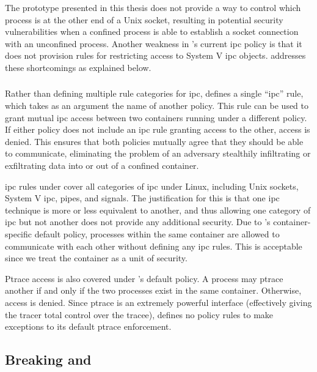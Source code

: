 The \bpfbox{} prototype presented in this thesis does not provide a way to control which
process is at the other end of a Unix socket, resulting in potential security
vulnerabilities when a confined process is able to establish a socket connection with an
unconfined process. Another weakness in \bpfbox{}'s current \gls{ipc} policy is that it
does not provision rules for restricting access to System V \gls{ipc} objects.
\bpfcontain{} addresses these shortcomings as explained below.

\subsubsection{\bpfcontain{}}

Rather than defining multiple rule categories for \gls{ipc}, \bpfcontain{} defines
a single \enquote{\gls{ipc}} rule, which takes as an argument the name of another
\bpfcontain{} policy. This rule can be used to grant mutual \gls{ipc} access between two
containers running under a different policy. If either policy does not include an
\gls{ipc} rule granting access to the other, access is denied. This ensures that both
policies mutually agree that they should be able to communicate, eliminating the problem
of an adversary stealthily infiltrating or exfiltrating data into or out of a confined
container.

\gls{ipc} rules under \bpfcontain{} cover all categories of \gls{ipc} under Linux,
including Unix sockets, System V \gls{ipc}, pipes, and signals. The justification for this
is that one \gls{ipc} technique is more or less equivalent to another, and thus allowing
one category of \gls{ipc} but not another does not provide any additional security. Due to
\bpfcontain{}'s container-specific default policy, processes within the same container are
allowed to communicate with each other without defining any \gls{ipc} rules. This is
acceptable since we treat the container as a unit of security.

Ptrace access is also covered under \bpfcontain{}'s default policy. A process may ptrace
another if and only if the two processes exist in the same container. Otherwise, access is
denied. Since ptrace is an extremely powerful interface (effectively giving the tracer
total control over the tracee), \bpfcontain{} defines no policy rules to make exceptions
to its default ptrace enforcement.

\subsection{Breaking \bpfbox{} and \bpfcontain{}}

